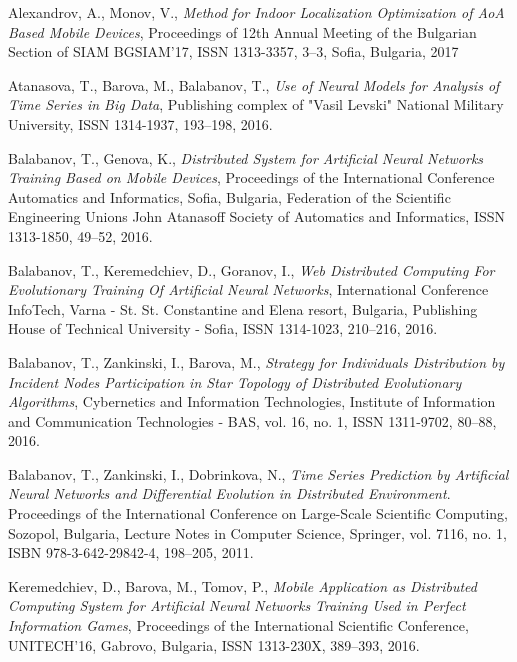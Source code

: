 \documentclass{llncs}
\begin{document}
\begin{thebibliography}{99}

 Alexandrov, A., Monov, V., \textit{Method for Indoor Localization Optimization of AoA Based Mobile Devices}, Proceedings of 12th Annual Meeting of the Bulgarian Section of SIAM BGSIAM’17, ISSN 1313-3357, 3--3, Sofia, Bulgaria, 2017

 Atanasova, T., Barova, M., Balabanov, T., \textit{Use of Neural Models for Analysis of Time Series in Big Data}, Publishing complex of "Vasil Levski" National Military University, ISSN 1314-1937, 193--198, 2016.

 Balabanov, T., Genova, K., \textit{Distributed System for Artificial Neural Networks Training Based on Mobile Devices}, Proceedings of the International Conference Automatics and Informatics, Sofia, Bulgaria, Federation of the Scientific Engineering Unions John Atanasoff Society of Automatics and Informatics, ISSN 1313-1850, 49--52, 2016.

 Balabanov, T., Keremedchiev, D., Goranov, I., \textit{Web Distributed Computing For Evolutionary Training Of Artificial Neural Networks}, International Conference InfoTech, Varna - St. St. Constantine and Elena resort, Bulgaria, Publishing House of Technical University - Sofia, ISSN 1314-1023, 210--216, 2016.

 Balabanov, T., Zankinski, I., Barova, M., \textit{Strategy for Individuals Distribution by Incident Nodes Participation in Star Topology of Distributed Evolutionary Algorithms}, Cybernetics and Information Technologies, Institute of Information and Communication Technologies - BAS, vol. 16, no. 1, ISSN 1311-9702, 80--88, 2016.

 Balabanov, T., Zankinski, I., Dobrinkova, N., \textit{Time Series Prediction by Artificial Neural Networks and Differential Evolution in Distributed Environment}. Proceedings of the International Conference on Large-Scale Scientific Computing, Sozopol, Bulgaria, Lecture Notes in Computer Science, Springer, vol. 7116, no. 1, ISBN 978-3-642-29842-4, 198–205, 2011. 

 Keremedchiev, D., Barova, M., Tomov, P., \textit{Mobile Application as Distributed Computing System for Artificial Neural Networks Training Used in Perfect Information Games}, Proceedings of the International Scientific Conference, UNITECH’16, Gabrovo, Bulgaria, ISSN 1313-230X, 389--393, 2016.


\end{thebibliography}
\end{document}
